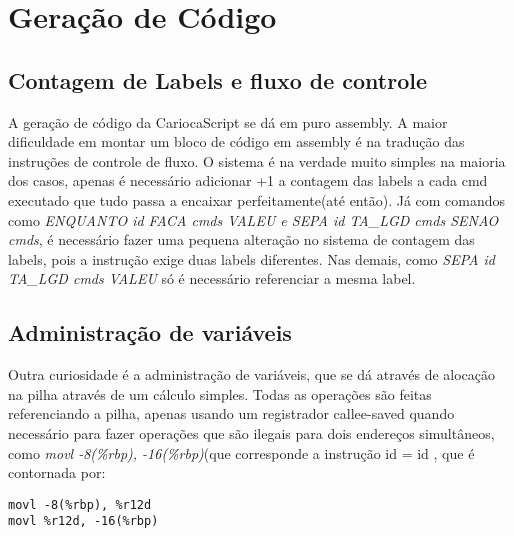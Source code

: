 \documentclass{article}
\begin{document}
\section{Geração de Código}

\subsection{Contagem de Labels e fluxo de controle}
A geração de código da CariocaScript se dá em puro assembly. A maior
dificuldade em montar um bloco de código em assembly é na tradução das
instruções de controle de fluxo. O sistema é na verdade muito simples na
maioria dos casos, apenas é necessário adicionar +1 a contagem das labels a
cada cmd executado que tudo passa a encaixar perfeitamente(até então). Já com
comandos como \textit{ENQUANTO id FACA cmds VALEU e SEPA id TA\_LGD cmds SENAO cmds},
 é necessário fazer uma pequena alteração no sistema de contagem
das labels, pois a instrução exige duas labels diferentes. Nas demais, como
\textit{SEPA id TA\_LGD cmds VALEU} só é necessário referenciar a mesma label.

\subsection{Administração de variáveis}
Outra curiosidade é a administração de variáveis, que se dá através de alocação
na pilha através de um cálculo simples. Todas as operações são feitas
referenciando a pilha, apenas usando um registrador callee-saved quando
necessário para fazer operações que são ilegais para dois endereços
simultâneos, como \textit{movl -8(\%rbp), -16(\%rbp)}(que corresponde a instrução id = id
, que é contornada por:


\begin{lstlisting}
movl -8(%rbp), %r12d
movl %r12d, -16(%rbp)
\end{lstlisting}
\end{document}
